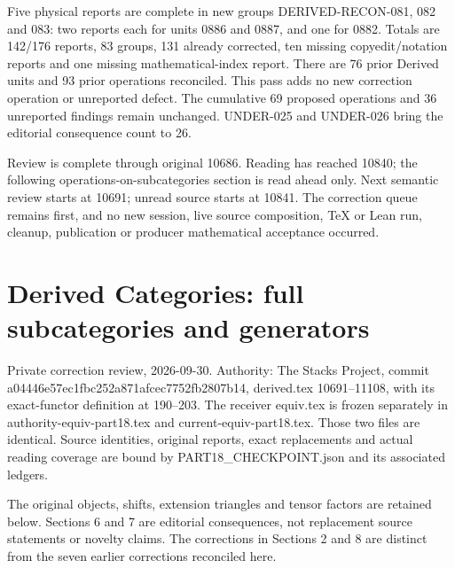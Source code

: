 \documentclass[11pt]{article}
\begin{document}
Five physical reports are complete in new groups DERIVED-RECON-081,\allowbreak{} 082 and 083:\allowbreak{} two reports each for units 0886 and 0887,\allowbreak{} and one for 0882. Totals are 142/\allowbreak{}176 reports,\allowbreak{} 83 groups,\allowbreak{} 131 already corrected,\allowbreak{} ten missing copyedit/\allowbreak{}notation reports and one missing mathematical-index report. There are 76 prior Derived units and 93 prior operations reconciled. This pass adds no new correction operation or unreported defect. The cumulative 69 proposed operations and 36 unreported findings remain unchanged. UNDER-025 and UNDER-026 bring the editorial consequence count to 26.

Review is complete through original 10686. Reading has reached 10840; the following operations-on-subcategories section is read ahead only. Next semantic review starts at 10691; unread source starts at 10841. The correction queue remains first,\allowbreak{} and no new session,\allowbreak{} live source composition,\allowbreak{} TeX or Lean run,\allowbreak{} cleanup,\allowbreak{} publication or producer mathematical acceptance occurred.
\clearpage
\section{\texorpdfstring{Derived Categories:\allowbreak{} full subcategories and generators}{Derived  full subcategories and generators}}\label{proofs-10691-11108-derived-categories-full-subcategories-and-generators}

Private correction review,\allowbreak{} 2026-09-30. Authority:\allowbreak{} The Stacks Project,\allowbreak{} commit a04446e5\allowbreak{}7ec1fbc2\allowbreak{}52a871af\allowbreak{}cec7752f\allowbreak{}b2807b14, derived.tex 10691–\allowbreak{}11108,\allowbreak{} with its exact-functor definition at 190–\allowbreak{}203. The receiver equiv.tex is frozen separately in authority-equiv-part18.tex and current-equiv-part18.tex. Those two files are identical. Source identities,\allowbreak{} original reports,\allowbreak{} exact replacements and actual reading coverage are bound by PART18\_\allowbreak{}CHECKPOINT.json and its associated ledgers.

The original objects,\allowbreak{} shifts,\allowbreak{} extension triangles and tensor factors are retained below. Sections 6 and 7 are editorial consequences,\allowbreak{} not replacement source statements or novelty claims. The corrections in Sections 2 and 8 are distinct from the seven earlier corrections reconciled here.
\end{document}

